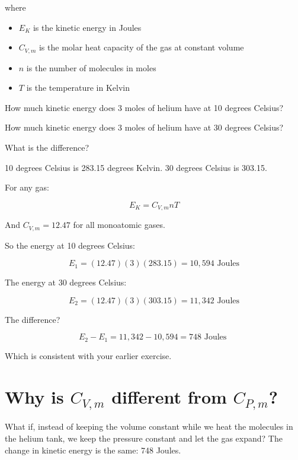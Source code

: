 where

\begin{itemize}
\item $E_K$ is the kinetic energy in Joules
\item $C_{V,m}$ is the molar heat capacity of the gas at constant volume
\item $n$ is the number of molecules in moles
\item $T$ is the temperature in Kelvin
\end{itemize}


\begin{Exercise}[title={Warming Helium Revisited},  label=warming_helium2]

How much kinetic energy does 3 moles of helium have at 10 degrees Celsius?

How much kinetic energy does 3 moles of helium have at 30 degrees Celsius?

What is the difference?

\end{Exercise}
\begin{Answer}[ref=warming_helium2]

10 degrees Celsius is 283.15 degrees Kelvin.  30 degrees Celsius is 303.15.

For any gas:

$$E_K =C_{V,m} n T$$

And $C_{V,m} = 12.47$ for all monoatomic gases.

So the energy at 10 degrees Celsius:

$$E_1 = (12.47)(3)(283.15) = 10,594 \text{ Joules}$$

The energy at 30 degrees Celsius:

$$E_2 = (12. 47)(3)(303.15) = 11,342 \text{ Joules}$$

The difference?

$$E_2 - E_1 = 11,342 - 10,594   = 748 \text{ Joules }$$

Which is consistent with your earlier exercise.

\end{Answer}

\section{Why is $C_{V,m}$ different from $C_{P,m}$?}

What if, instead of keeping the volume constant while we heat the molecules in the helium tank,  we keep the pressure constant and let the gas expand?  
The change in kinetic energy is the same: 748 Joules.

